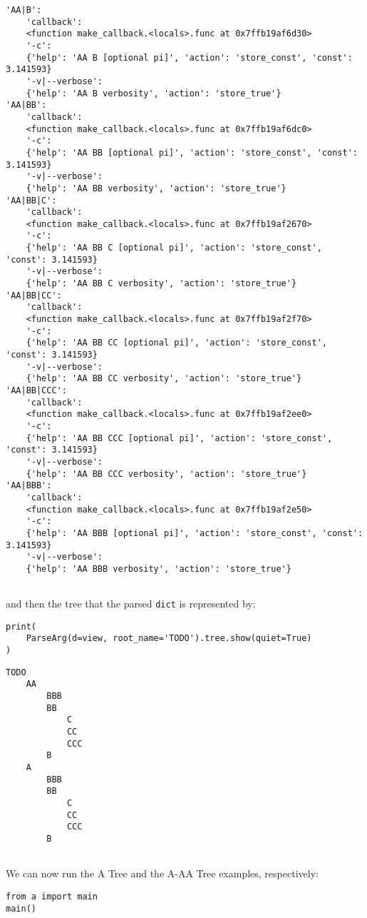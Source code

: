 \documentclass[10pt]{amsart}
\numberwithin{equation}{section}
\begin{document}
\begin{verbatim}
'AA|B':
    'callback':
    <function make_callback.<locals>.func at 0x7ffb19af6d30>
    '-c':
    {'help': 'AA B [optional pi]', 'action': 'store_const', 'const': 3.141593}
    '-v|--verbose':
    {'help': 'AA B verbosity', 'action': 'store_true'}
'AA|BB':
    'callback':
    <function make_callback.<locals>.func at 0x7ffb19af6dc0>
    '-c':
    {'help': 'AA BB [optional pi]', 'action': 'store_const', 'const': 3.141593}
    '-v|--verbose':
    {'help': 'AA BB verbosity', 'action': 'store_true'}
'AA|BB|C':
    'callback':
    <function make_callback.<locals>.func at 0x7ffb19af2670>
    '-c':
    {'help': 'AA BB C [optional pi]', 'action': 'store_const', 'const': 3.141593}
    '-v|--verbose':
    {'help': 'AA BB C verbosity', 'action': 'store_true'}
'AA|BB|CC':
    'callback':
    <function make_callback.<locals>.func at 0x7ffb19af2f70>
    '-c':
    {'help': 'AA BB CC [optional pi]', 'action': 'store_const', 'const': 3.141593}
    '-v|--verbose':
    {'help': 'AA BB CC verbosity', 'action': 'store_true'}
'AA|BB|CCC':
    'callback':
    <function make_callback.<locals>.func at 0x7ffb19af2ee0>
    '-c':
    {'help': 'AA BB CCC [optional pi]', 'action': 'store_const', 'const': 3.141593}
    '-v|--verbose':
    {'help': 'AA BB CCC verbosity', 'action': 'store_true'}
'AA|BBB':
    'callback':
    <function make_callback.<locals>.func at 0x7ffb19af2e50>
    '-c':
    {'help': 'AA BBB [optional pi]', 'action': 'store_const', 'const': 3.141593}
    '-v|--verbose':
    {'help': 'AA BBB verbosity', 'action': 'store_true'}


\end{verbatim}
and then the tree that the parsed \texttt{dict} is represented by:
\begin{verbatim}
print(
    ParseArg(d=view, root_name='TODO').tree.show(quiet=True)
)
\end{verbatim}

\begin{verbatim}
TODO
    AA
        BBB
        BB
            C
            CC
            CCC
        B
    A
        BBB
        BB
            C
            CC
            CCC
        B


\end{verbatim}


We can now run the A Tree and the A-AA Tree examples, respectively:
\begin{verbatim}
from a import main
main()
\end{verbatim}
\end{document}
